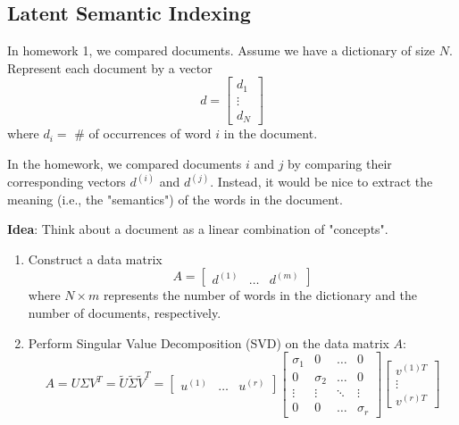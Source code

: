 \subsection{Latent Semantic Indexing}
\begin{example}
    In homework 1, we compared documents. Assume we have a dictionary of size \( N \). Represent each document by a vector 
    \[
    d = \begin{bmatrix} d_1 \\ \vdots \\ d_N \end{bmatrix}
    \]
    where \( d_i = \) \# of occurrences of word \( i \) in the document.
    \vspace{1em}

    In the homework, we compared documents \( i \) and \( j \) by comparing their corresponding vectors \( d^{(i)} \) and \( d^{(j)} \). Instead, it would be nice to extract the meaning (i.e., the "semantics") of the words in the document.
    \vspace{1em}

    \textbf{Idea}: Think about a document as a linear combination of "concepts". 
    \begin{enumerate}
        \item Construct a data matrix 
        \[
        A = \begin{bmatrix} d^{(1)} & \ldots & d^{(m)} \end{bmatrix}
        \]
        where \( N \times m \) represents the number of words in the dictionary and the number of documents, respectively.
        \vspace{1em}
        
        \item Perform Singular Value Decomposition (SVD) on the data matrix \( A \):
        \[
        A = U \Sigma V^T = \tilde{U} \tilde{\Sigma} \tilde{V}^T = \begin{bmatrix} u^{(1)} & \ldots & u^{(r)} \end{bmatrix} 
        \begin{bmatrix}
        \sigma_1 & 0 & \ldots & 0 \\
        0 & \sigma_2 & \ldots & 0 \\
        \vdots & \vdots & \ddots & \vdots \\
        0 & 0 & \ldots & \sigma_r
        \end{bmatrix} 
        \begin{bmatrix} v^{(1)T} \\ \vdots \\ v^{(r)T} \end{bmatrix}
        \]
    

\end{enumerate}
\end{example}
